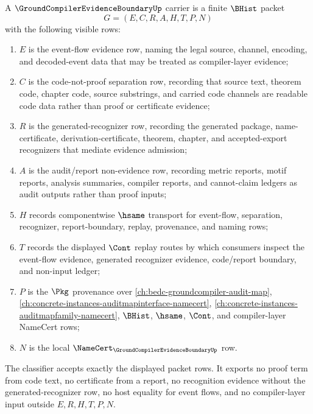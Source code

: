 \begin{definition}
\label{def:groundcompiler-evidence-boundary-carrier}
A $\GroundCompilerEvidenceBoundaryUp$ carrier is a finite $\BHist$ packet
$$
G=(E,C,R,A,H,T,P,N)
$$
with the following visible rows:
\begin{enumerate}
\item $E$ is the event-flow evidence row, naming the legal source, channel, encoding, and decoded-event data that may be treated as compiler-layer evidence;
\item $C$ is the code-not-proof separation row, recording that source text, theorem code, chapter code, source substrings, and carried code channels are readable code data rather than proof or certificate evidence;
\item $R$ is the generated-recognizer row, recording the generated package, name-certificate, derivation-certificate, theorem, chapter, and accepted-export recognizers that mediate evidence admission;
\item $A$ is the audit/report non-evidence row, recording metric reports, motif reports, analysis summaries, compiler reports, and cannot-claim ledgers as audit outputs rather than proof inputs;
\item $H$ records componentwise $\hsame$ transport for event-flow, separation, recognizer, report-boundary, replay, provenance, and naming rows;
\item $T$ records the displayed $\Cont$ replay routes by which consumers inspect the event-flow evidence, generated recognizer evidence, code/report boundary, and non-input ledger;
\item $P$ is the $\Pkg$ provenance over \autoref{ch:bedc-groundcompiler-audit-map}, \autoref{ch:concrete-instances-auditmapinterface-namecert}, \autoref{ch:concrete-instances-auditmapfamily-namecert}, $\BHist$, $\hsame$, $\Cont$, and compiler-layer NameCert rows;
\item $N$ is the local $\NameCert_{\GroundCompilerEvidenceBoundaryUp}$ row.
\end{enumerate}
The classifier accepts exactly the displayed packet rows. It exports no proof term from code text, no certificate from a report, no recognition evidence without the generated-recognizer row, no host equality for event flows, and no compiler-layer input outside $E,R,H,T,P,N$.
\end{definition}

